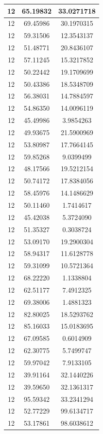 \documentclass[
]{book}
\begin{document}
\begin{tabular}{c|c|c}
\hline
12 & 65.19832 & 33.0271718\\
\hline
12 & 69.45986 & 30.1970315\\
\hline
12 & 59.31506 & 12.3543137\\
\hline
12 & 51.48771 & 20.8436107\\
\hline
12 & 57.11245 & 15.3217852\\
\hline
12 & 50.22442 & 19.1709699\\
\hline
12 & 50.43386 & 18.5348709\\
\hline
12 & 56.38031 & 14.7884597\\
\hline
12 & 54.86350 & 14.0096119\\
\hline
12 & 45.49986 & 3.9854263\\
\hline
12 & 49.93675 & 21.5900969\\
\hline
12 & 53.80987 & 17.7664145\\
\hline
12 & 59.85268 & 9.0399499\\
\hline
12 & 48.17566 & 19.5212154\\
\hline
12 & 50.74172 & 17.8384056\\
\hline
12 & 58.45976 & 14.1486629\\
\hline
12 & 50.11460 & 1.7414617\\
\hline
12 & 45.42038 & 5.3724090\\
\hline
12 & 51.35327 & 0.3038724\\
\hline
12 & 53.09170 & 19.2900304\\
\hline
12 & 58.94317 & 11.6128778\\
\hline
12 & 59.31099 & 10.5721364\\
\hline
12 & 68.22220 & 1.1338804\\
\hline
12 & 62.51177 & 7.4912325\\
\hline
12 & 69.38006 & 1.4881323\\
\hline
12 & 82.80025 & 18.5293762\\
\hline
12 & 85.16033 & 15.0183695\\
\hline
12 & 67.09585 & 0.6014909\\
\hline
12 & 62.30775 & 5.7499747\\
\hline
12 & 59.97042 & 7.9133105\\
\hline
12 & 39.91164 & 32.1440226\\
\hline
12 & 39.59650 & 32.1361317\\
\hline
12 & 95.59342 & 33.2341294\\
\hline
12 & 52.77229 & 99.6134717\\
\hline
12 & 53.17861 & 98.6038612\\

\end{tabular}
\end{document}
